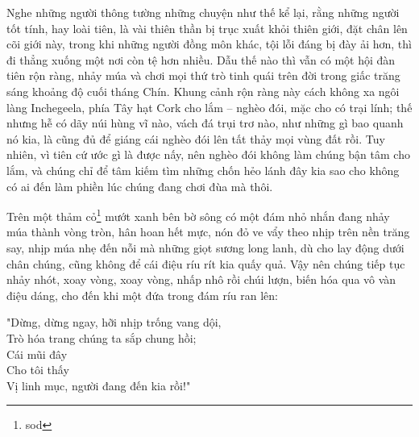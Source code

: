 Nghe những người thông tường những chuyện như thế kể lại, rằng những người tốt tính, hay loài tiên, là vài thiên thần bị trục xuất khỏi thiên giới, đặt chân lên cõi giới này, trong khi những người đồng môn khác, tội lỗi đáng bị đày ải hơn, thì đi thẳng xuống một nơi còn tệ hơn nhiều. Dẫu thế nào thì vẫn có một hội đàn tiên rộn ràng, nhảy múa và chơi mọi thứ trò tinh quái trên đời trong giấc trăng sáng khoảng độ cuối tháng Chín. Khung cảnh rộn ràng này cách không xa ngôi làng Inchegeela, phía Tây hạt Cork cho lắm – nghèo đói, mặc cho có trại lính; thế nhưng hễ có dãy núi hùng vĩ nào, vách đá trụi trơ nào, như những gì bao quanh nó kia, là cũng đủ để giáng cái nghèo đói lên tất thảy mọi vùng đất rồi. Tuy nhiên, vì tiên cứ ước gì là được nấy, nên nghèo đói không làm chúng bận tâm cho lắm, và chúng chỉ để tâm kiếm tìm những chốn hẻo lánh đây kia sao cho không có ai đến làm phiền lúc chúng đang chơi đùa mà thôi.

Trên một thảm cỏ\footnote{sod} mướt xanh bên bờ sông có một đám nhỏ nhắn đang nhảy múa thành vòng tròn, hân hoan hết mực, nón đỏ ve vẩy theo nhịp trên nền trăng say, nhịp múa nhẹ đến nỗi mà những giọt sương long lanh, dù cho lay động dưới chân chúng, cũng không để cái điệu ríu rít kia quấy quả. Vậy nên chúng tiếp tục nhảy nhót, xoay vòng, xoay vòng, nhấp nhô rồi chúi lượn, biến hóa qua vô vàn điệu dáng, cho đến khi một đứa trong đám ríu ran lên:

\begin{center}
  "Dừng, dừng ngay, hỡi nhịp trống vang dội,\\
  Trò hóa trang chúng ta sắp chung hồi;\\
  Cái mũi đây\\
  Cho tôi thấy\\
  Vị linh mục, người đang đến kia rồi!"\\
\end{center}
